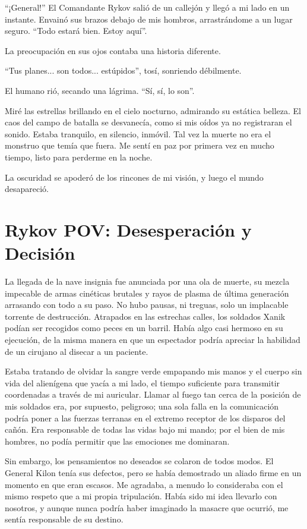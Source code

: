 \documentclass[spanish,12pt,a4paper,oneside,titlepage]{book}
\begin{document}
    ``¡General!'' El Comandante Rykov salió de un callejón y llegó a mi lado en un instante. Envainó sus brazos debajo de mis hombros, arrastrándome a un lugar seguro. ``Todo estará bien. Estoy aquí''.

    La preocupación en sus ojos contaba una historia diferente.

    ``Tus planes... son todos... estúpidos'', tosí, sonriendo débilmente.

    El humano rió, secando una lágrima. ``Sí, sí, lo son''.

    Miré las estrellas brillando en el cielo nocturno, admirando su estática belleza. El caos del campo de batalla se desvanecía, como si mis oídos ya no registraran el sonido. Estaba tranquilo, en silencio, inmóvil. Tal vez la muerte no era el monstruo que temía que fuera. Me sentí en paz por primera vez en mucho tiempo, listo para perderme en la noche.

    La oscuridad se apoderó de los rincones de mi visión, y luego el mundo desapareció.

    \chapter{Rykov POV: Desesperación y Decisión}

    La llegada de la nave insignia fue anunciada por una ola de muerte, su mezcla impecable de armas cinéticas brutales y rayos de plasma de última generación arrasando con todo a su paso. No hubo pausas, ni treguas, solo un implacable torrente de destrucción. Atrapados en las estrechas calles, los soldados Xanik podían ser recogidos como peces en un barril. Había algo casi hermoso en su ejecución, de la misma manera en que un espectador podría apreciar la habilidad de un cirujano al disecar a un paciente.

    Estaba tratando de olvidar la sangre verde empapando mis manos y el cuerpo sin vida del alienígena que yacía a mi lado, el tiempo suficiente para transmitir coordenadas a través de mi auricular. Llamar al fuego tan cerca de la posición de mis soldados era, por supuesto, peligroso; una sola falla en la comunicación podría poner a las fuerzas terranas en el extremo receptor de los disparos del cañón. Era responsable de todas las vidas bajo mi mando; por el bien de mis hombres, no podía permitir que las emociones me dominaran.

    Sin embargo, los pensamientos no deseados se colaron de todos modos. El General Kilon tenía sus defectos, pero se había demostrado un aliado firme en un momento en que eran escasos. Me agradaba, a menudo lo consideraba con el mismo respeto que a mi propia tripulación. Había sido mi idea llevarlo con nosotros, y aunque nunca podría haber imaginado la masacre que ocurrió, me sentía responsable de su destino.
\end{document}
